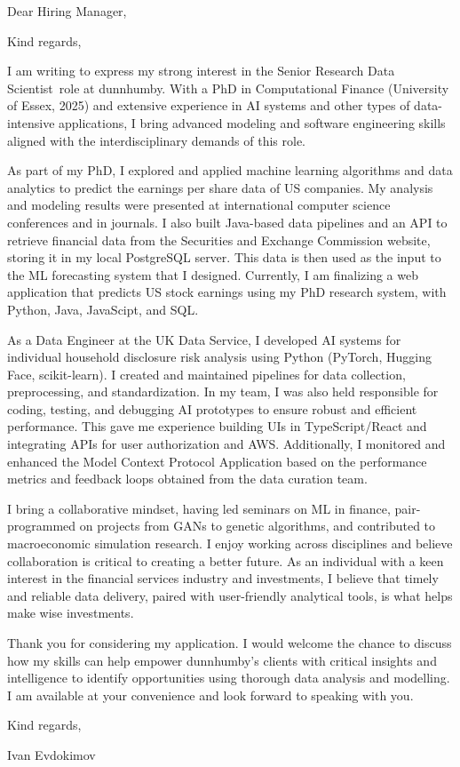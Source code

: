 \documentclass[11pt,a4paper,sans]{moderncv}
\newcommand{\positionname}{Senior Research Data Scientist}
\newcommand{\companyfull}{ dunnhumby }
\newcommand{\companyshort}{dunnhumby}
\begin{document}
\date{\today}
\opening{Dear Hiring Manager,}
\closing{Kind regards,}

\makelettertitle

I am writing to express my strong interest in the \positionname~role at \companyshort. With a PhD in Computational Finance (University of Essex, 2025) and extensive experience in AI systems and other types of data-intensive applications, I bring advanced modeling and software engineering skills aligned with the interdisciplinary demands of this role.

As part of my PhD, I explored and applied machine learning algorithms and data analytics to predict the earnings per share data of US companies. My analysis and modeling results were presented at international computer science conferences and in journals. I also built Java-based data pipelines and an API to retrieve financial data from the Securities and Exchange Commission website, storing it in my local PostgreSQL server. This data is then used as the input to the ML forecasting system that I designed. Currently, I am finalizing a web application that predicts US stock earnings using my PhD research system, with Python, Java, JavaScipt, and SQL.

As a Data Engineer at the UK Data Service, I developed AI systems for individual household disclosure risk analysis using Python (PyTorch, Hugging Face, scikit-learn). I created and maintained pipelines for data collection, preprocessing, and standardization. In my team, I was also held responsible for coding, testing, and debugging AI prototypes to ensure robust and efficient performance. This gave me experience building UIs in TypeScript/React and integrating APIs for user authorization and AWS. Additionally, I monitored and enhanced the Model Context Protocol Application based on the performance metrics and feedback loops obtained from the data curation team.

I bring a collaborative mindset, having led seminars on ML in finance, pair-programmed on projects from GANs to genetic algorithms, and contributed to macroeconomic simulation research. I enjoy working across disciplines and believe collaboration is critical to creating a better future. As an individual with a keen interest in the financial services industry and investments, I believe that timely and reliable data delivery, paired with user-friendly analytical tools, is what helps make wise investments.

Thank you for considering my application. I would welcome the chance to discuss how my skills can help empower \companyshort's clients with critical insights and intelligence to identify opportunities using thorough data analysis and modelling. I am available at your convenience and look forward to speaking with you.

\vspace{0.25cm}
Kind regards,

Ivan Evdokimov
\end{document}

